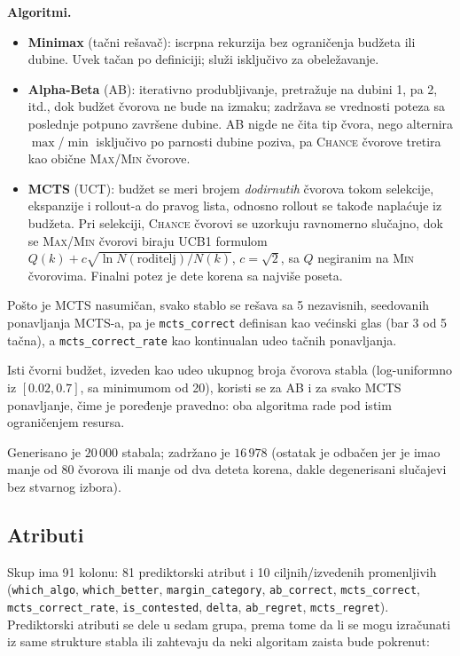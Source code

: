 \documentclass[12pt, a4paper]{article}
\begin{document}
\textbf{Algoritmi.}
\begin{itemize}[noitemsep]
    \item \textbf{Minimax} (tačni rešavač): iscrpna rekurzija bez ograničenja budžeta ili dubine.
    Uvek tačan po definiciji; služi isključivo za obeležavanje.
    \item \textbf{Alpha-Beta} (AB): iterativno produbljivanje, pretražuje na dubini 1, pa 2,
    itd., dok budžet čvorova ne bude na izmaku; zadržava se vrednosti poteza sa poslednje
    potpuno završene dubine. AB nigde ne čita tip čvora, nego alternira
    $\max$/$\min$ isključivo po parnosti dubine poziva, pa \textsc{Chance} čvorove tretira kao
    obične \textsc{Max}/\textsc{Min} čvorove.
    \item \textbf{MCTS} (UCT): budžet se meri brojem \textit{dodirnutih} čvorova tokom
    selekcije, ekspanzije i rollout-a do pravog lista, odnosno
    rollout se takođe naplaćuje iz budžeta. Pri selekciji,
    \textsc{Chance} čvorovi se uzorkuju ravnomerno slučajno, dok se
    \textsc{Max}/\textsc{Min} čvorovi biraju UCB1 formulom
    $Q(k) + c\sqrt{\ln N(\text{roditelj})/N(k)}$, $c = \sqrt{2}$, sa $Q$ negiranim na
    \textsc{Min} čvorovima. Finalni potez je dete korena sa najviše poseta.
\end{itemize}

Pošto je MCTS nasumičan, svako stablo se rešava sa 5 nezavisnih, seedovanih
ponavljanja MCTS-a, pa je \texttt{mcts\_correct}
definisan kao većinski glas (bar 3 od 5 tačna), a \texttt{mcts\_correct\_rate} kao kontinualan
udeo tačnih ponavljanja. 

Isti čvorni budžet, izveden kao udeo ukupnog broja čvorova stabla
(log-uniformno iz $[0.02, 0.7]$, sa minimumom od 20), koristi se za AB i za svako MCTS
ponavljanje, čime je poređenje pravedno: oba algoritma rade pod istim ograničenjem resursa.

Generisano je $20\,000$ stabala; zadržano je $16\,978$ (ostatak je odbačen jer je imao manje
od 80 čvorova ili manje od dva deteta korena, dakle degenerisani slučajevi bez stvarnog izbora).

\subsection{Atributi}

Skup ima 91 kolonu: 81 prediktorski atribut i 10 ciljnih/izvedenih promenljivih
(\texttt{which\_algo}, \texttt{which\_better}, \texttt{margin\_category}, \texttt{ab\_correct},
\texttt{mcts\_correct}, \texttt{mcts\_correct\_rate}, \texttt{is\_contested}, \texttt{delta},
\texttt{ab\_regret}, \texttt{mcts\_regret}). Prediktorski atributi se dele u sedam grupa, prema
tome da li se mogu izračunati iz same strukture stabla ili zahtevaju da neki algoritam zaista bude pokrenut:
\end{document}
